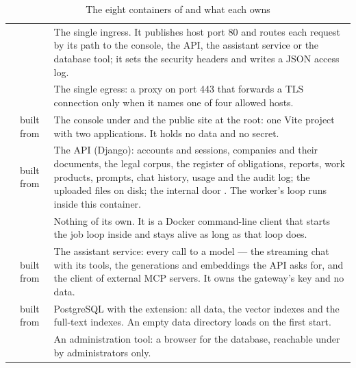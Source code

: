 \begin{table}[H]
\caption{The eight containers of  and what each owns}\label{tab:arch:containers}
\begin{tabularx}{\textwidth}{@{}L{36mm}L{33mm}Y@{}}
\toprule
{} &  &  \\
\midrule
{} &  & The single ingress. It publishes host port 80 and routes each request by its path to the console, the API, the assistant service or the database tool; it sets the security headers and writes a JSON access log. \\
 &  & The single egress: a proxy on port 443 that forwards a TLS connection only when it names one of four allowed hosts. \\
 & built from  & The console under  and the public site at the root: one Vite project with two applications. It holds no data and no secret. \\
 & built from  & The API (Django): accounts and sessions, companies and their documents, the legal corpus, the register of obligations, reports, work products, prompts, chat history, usage and the audit log; the uploaded files on disk; the internal door . The worker's loop runs inside this container. \\
 &  & Nothing of its own. It is a Docker command-line client that starts the job loop inside  and stays alive as long as that loop does. \\
 & built from  & The assistant service: every call to a model --- the streaming chat with its tools, the generations and embeddings the API asks for, and the client of external MCP servers. It owns the gateway's key and no data. \\
 & built from  & PostgreSQL with the  extension: all data, the vector indexes and the full-text indexes. An empty data directory loads  on the first start. \\
 &  & An administration tool: a browser for the database, reachable under  by administrators only. \\
\bottomrule
\end{tabularx}
\end{table}

